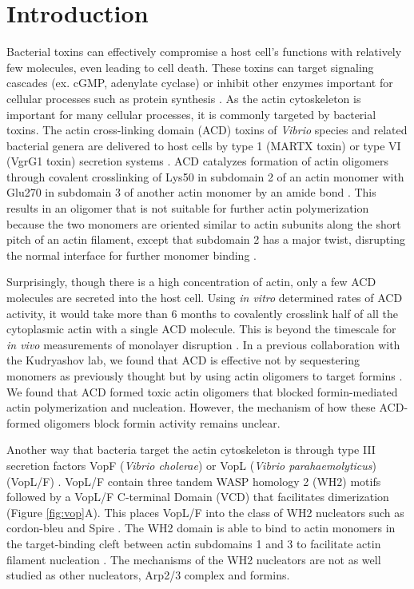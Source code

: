 \section{Introduction}\label{ch04-introduction}
Bacterial toxins can effectively compromise a host cell's functions with relatively few molecules, even leading to cell death. These toxins can target signaling cascades (ex. cGMP, adenylate cyclase) or inhibit other enzymes important for cellular processes such as protein synthesis \citep{henkel_toxins_2010}. As the actin cytoskeleton is important for many cellular processes, it is commonly targeted by bacterial toxins. The actin cross-linking domain (ACD) toxins of \textit{Vibrio} species and related bacterial genera are delivered to host cells by type 1 (MARTX toxin) \citep{sheahan_identification_2004} or type VI (VgrG1 toxin) secretion systems \citep{pukatzki_type_2007}. ACD catalyzes formation of actin oligomers through covalent crosslinking of Lys50 in subdomain 2 of an actin monomer with Glu270 in subdomain 3 of another actin monomer by an amide bond \citep{kudryashov_connecting_2008,kudryashova_glutamyl_2012}. This results in an oligomer that is not suitable for further actin polymerization because the two monomers are oriented similar to actin subunits along the short pitch of an actin filament, except that subdomain 2 has a major twist, disrupting the normal interface for further monomer binding \citep{kudryashov_connecting_2008}. 

Surprisingly, though there is a high concentration of actin, only a few ACD molecules are secreted into the host cell. Using \textit{in vitro} determined rates of ACD activity, it would take more than 6 months to covalently crosslink half of all the cytoplasmic actin with a single ACD molecule. This is beyond the timescale for \textit{in vivo} measurements of monolayer disruption \citep{kudryashova_glutamyl_2012, heisler_acd_2015}. In a previous collaboration with the Kudryashov lab, we found that ACD is effective not by sequestering monomers as previously thought but by using actin oligomers to target formins \citep{heisler_acd_2015}. We found that ACD formed toxic actin oligomers that blocked formin-mediated actin polymerization and nucleation. However, the mechanism of how these ACD-formed oligomers block formin activity remains unclear. 

Another way that bacteria target the actin cytoskeleton is through type III secretion factors VopF (\textit{Vibrio cholerae}) or VopL (\textit{Vibrio parahaemolyticus}) (VopL/F) \citep{tam_type_2007,liverman_arp2/3-independent_2007}. VopL/F contain three tandem WASP homology 2 (WH2) motifs followed by a VopL/F C-terminal Domain (VCD) that facilitates dimerization (Figure \ref{fig:vop}A). This places VopL/F into the class of WH2 nucleators such as cordon-bleu and Spire \citep{qualmann_new_2009}. The WH2 domain is able to bind to actin monomers in the target-binding cleft between actin subdomains 1 and 3 to facilitate actin filament nucleation \citep{namgoong_mechanism_2011}. The mechanisms of the WH2 nucleators are not as well studied as other nucleators, Arp2/3 complex and formins. 

